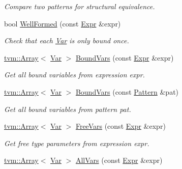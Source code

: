 \begin{DoxyCompactItemize}
\begin{DoxyCompactList}\small\item\em Compare two patterns for structural equivalence. \end{DoxyCompactList}\item 
bool \hyperlink{namespacetvm_1_1relay_a59dde25d981d5b506115dd4dba7f67b7}{Well\+Formed} (const \hyperlink{namespacetvm_1_1relay_a5b84e3790f89bb3fad5c7911eeb99531}{Expr} \&expr)
\begin{DoxyCompactList}\small\item\em Check that each \hyperlink{classtvm_1_1relay_1_1Var}{Var} is only bound once. \end{DoxyCompactList}\item 
\hyperlink{classtvm_1_1Array}{tvm\+::\+Array}$<$ \hyperlink{classtvm_1_1relay_1_1Var}{Var} $>$ \hyperlink{namespacetvm_1_1relay_a0bcc32688b446d3574932554f6b8c2df}{Bound\+Vars} (const \hyperlink{namespacetvm_1_1relay_a5b84e3790f89bb3fad5c7911eeb99531}{Expr} \&expr)
\begin{DoxyCompactList}\small\item\em Get all bound variables from expression expr. \end{DoxyCompactList}\item 
\hyperlink{classtvm_1_1Array}{tvm\+::\+Array}$<$ \hyperlink{classtvm_1_1relay_1_1Var}{Var} $>$ \hyperlink{namespacetvm_1_1relay_aedcb2b290b4f80292eb34afefc41f0ac}{Bound\+Vars} (const \hyperlink{classtvm_1_1relay_1_1Pattern}{Pattern} \&pat)
\begin{DoxyCompactList}\small\item\em Get all bound variables from pattern pat. \end{DoxyCompactList}\item 
\hyperlink{classtvm_1_1Array}{tvm\+::\+Array}$<$ \hyperlink{classtvm_1_1relay_1_1Var}{Var} $>$ \hyperlink{namespacetvm_1_1relay_af2c5771c67f06c0af32c7b4b4269e73f}{Free\+Vars} (const \hyperlink{namespacetvm_1_1relay_a5b84e3790f89bb3fad5c7911eeb99531}{Expr} \&expr)
\begin{DoxyCompactList}\small\item\em Get free type parameters from expression expr. \end{DoxyCompactList}\item 
\hyperlink{classtvm_1_1Array}{tvm\+::\+Array}$<$ \hyperlink{classtvm_1_1relay_1_1Var}{Var} $>$ \hyperlink{namespacetvm_1_1relay_a6b1e94cf8d97514fe4a9493a0dec1559}{All\+Vars} (const \hyperlink{namespacetvm_1_1relay_a5b84e3790f89bb3fad5c7911eeb99531}{Expr} \&expr)

\end{DoxyCompactItemize}
